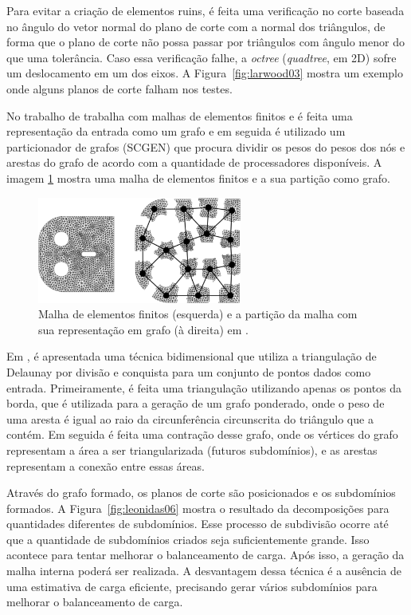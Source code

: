     Para evitar a criação de elementos ruins, é feita uma verificação no corte baseada no ângulo do vetor normal do plano de corte com a normal dos triângulos, de forma que o plano de corte não possa passar por triângulos com ângulo menor do que uma tolerância. Caso essa verificação falhe, a \textit{octree} (\textit{quadtree}, em 2D) sofre um deslocamento em um dos eixos. A Figura~\ref{fig:larwood03} mostra um exemplo onde alguns planos de corte falham nos testes. 
    
    No trabalho de \cite{bib:CHARMPIS05} trabalha com malhas de elementos finitos e é feita uma representação da entrada  como um grafo e em seguida é utilizado um particionador de grafos (SCGEN) que procura dividir os pesos do pesos dos nós e arestas do grafo de acordo com a quantidade de processadores disponíveis. A imagem \ref{fig:dimos} mostra uma malha de elementos finitos e a sua partição como grafo.
    
    
    \begin{figure}[htbp]
    	\centering
    	\includegraphics[width=0.6\textwidth]{fig/dimos.png}
    	\caption{Malha de elementos finitos (esquerda) e a partição da malha com sua representação em grafo (à direita) em \cite{bib:CHARMPIS05}. }
    	\label{fig:dimos}
    \end{figure}
    
    
    Em \cite{bib:Leonidas06}, é apresentada uma técnica bidimensional que utiliza a triangulação de Delaunay por divisão e conquista para um conjunto de pontos dados como entrada. Primeiramente, é feita uma triangulação utilizando apenas os pontos da borda, que é utilizada para a geração de um grafo ponderado, onde o peso de uma aresta é igual ao raio da circunferência circunscrita do triângulo que a contém. Em seguida é feita uma contração desse grafo, onde os vértices do grafo representam a área a ser triangularizada (futuros subdomínios), e as arestas representam a conexão entre essas áreas.
    
    Através do grafo formado, os planos de corte são posicionados e os subdomínios formados. A Figura~\ref{fig:leonidas06} mostra o resultado da decomposições para quantidades diferentes de subdomínios. Esse processo de subdivisão ocorre até que a quantidade de subdomínios criados seja suficientemente grande. Isso acontece para tentar melhorar o balanceamento de carga. Após isso, a geração da malha interna poderá ser realizada. A desvantagem dessa técnica é a ausência de uma estimativa de carga eficiente, precisando gerar vários subdomínios para melhorar o balanceamento de carga.
    
